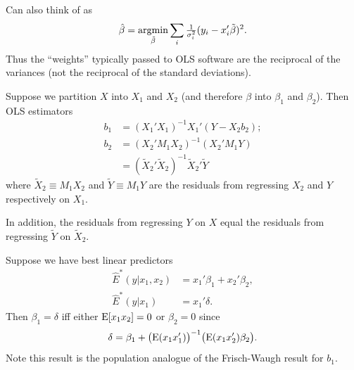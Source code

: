 \documentclass[8pt,letterpaper, landscape]{extarticle} %
\begin{document}
\begin{multicols}{3}
\begin{description}
Can also think of as
$$ \hat{\beta} = \operatorname*{argmin}_{\tilde{\beta}} \sum_{i} \tfrac{1}{\sigma_{i}^{2}} (y_i - x_{i}' \tilde{\beta})^{2} . $$
Thus the ``weights'' typically passed to OLS software are the reciprocal of the variances (not the reciprocal of the standard deviations).

 Suppose we partition $ X $ into $ X_1 $ and $ X_2 $ (and therefore $ \beta $ into $ \beta_1 $ and $ \beta_2 $). Then OLS estimators
\begin{align*}
b_1 &= (X_{1}' X_{1})^{-1} X_{1}' (Y - X_{2} b_{2}); \\
b_{2} &= (X_{2}' M_{1} X_{2})^{-1} (X_{2}' M_1 Y) \\
&= (\tilde{X}_{2}' \tilde{X}_{2})^{-1} \tilde{X}_{2}' \tilde{Y}
\end{align*}
where $ \tilde{X}_{2} \equiv M_{1} X_{2} $ and $ \tilde{Y} \equiv M_{1} Y $ are the residuals from regressing $ X_2 $ and $ Y $ respectively on $ X_1 $.

In addition, the residuals from regressing $ Y $ on $ X $ equal the residuals from regressing $ \tilde{Y} $ on $ \tilde{X}_{2} $.

 Suppose we have best linear predictors
\begin{align*}
\widehat{E}^*(y|x_1 , x_2) &= x_{1}' \beta_1 + x_{2}' \beta_2, \\
\widehat{E}^*(y|x_1      ) &= x_{1}' \delta .
\end{align*}
Then $ \beta_1 = \delta $ iff either $ \operatorname{E} [x_1 x_2 ] = 0 $ or $ \beta_2 = 0 $ since
\[ \delta = \beta_1 + \bigl ( \operatorname{E} (x_1 x_{1}') \bigr )^{-1} \bigl ( \operatorname{E} (x_1 x_{2}') \beta_2 \bigr ).  \]
Note this result is the population analogue of the Frisch-Waugh result for $ b_1 $.


\end{description}
\end{multicols}
\end{document}
